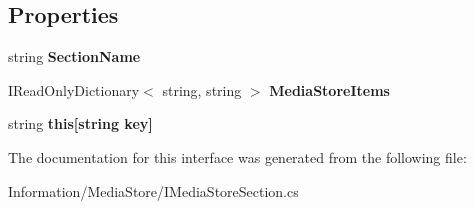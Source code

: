 \subsection*{Properties}
\begin{DoxyCompactItemize}
\item 
\hypertarget{interface_snowflake_1_1_information_1_1_media_store_1_1_i_media_store_section_ab0d70ad45cbbb8aadf5cd992e6d274d4}{}string {\bfseries Section\+Name}\label{interface_snowflake_1_1_information_1_1_media_store_1_1_i_media_store_section_ab0d70ad45cbbb8aadf5cd992e6d274d4}

\item 
\hypertarget{interface_snowflake_1_1_information_1_1_media_store_1_1_i_media_store_section_ad756842e38469738145eec216952c9b5}{}I\+Read\+Only\+Dictionary$<$ string, string $>$ {\bfseries Media\+Store\+Items}\label{interface_snowflake_1_1_information_1_1_media_store_1_1_i_media_store_section_ad756842e38469738145eec216952c9b5}

\item 
\hypertarget{interface_snowflake_1_1_information_1_1_media_store_1_1_i_media_store_section_ad878b6801659f539a1482b12e09468f6}{}string {\bfseries this\mbox{[}string key\mbox{]}}\label{interface_snowflake_1_1_information_1_1_media_store_1_1_i_media_store_section_ad878b6801659f539a1482b12e09468f6}

\end{DoxyCompactItemize}


The documentation for this interface was generated from the following file\+:\begin{DoxyCompactItemize}
\item 
Information/\+Media\+Store/I\+Media\+Store\+Section.\+cs\end{DoxyCompactItemize}
